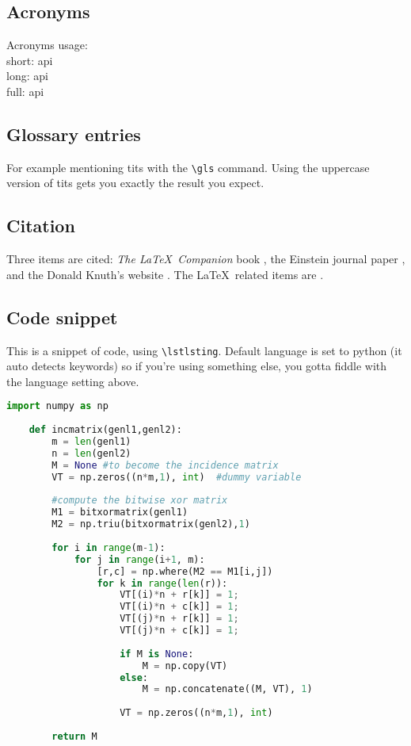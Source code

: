 \documentclass[12pt]{article}
\begin{document}
	\subsection{Acronyms}
	
	Acronyms usage: 
	\\ short: \acrshort{api} 
	\\ long: \acrlong{api}
	\\ full: \acrfull{api}
	
	
	\subsection{Glossary entries}
	
	For example mentioning \gls{tits} with the \texttt{\textbackslash gls} command. Using the uppercase version of \Gls{tits} gets you exactly the result you expect.

	\subsection{Citation}

	Three items are cited: \textit{The \LaTeX\ Companion} book \cite{latexcompanion}, the Einstein journal paper \cite{einstein}, and the Donald Knuth's website \cite{knuthwebsite}. The \LaTeX\ related items are \cite{latexcompanion,knuthwebsite}.
	\subsection{Code snippet}
	
    This is a snippet of code, using \texttt{\textbackslash lstlsting}. Default language is set to python (it auto detects keywords) so if you're using something else, you gotta fiddle with the language setting above.
    
    \begin{lstlisting}[language=Python]
    import numpy as np
     
    def incmatrix(genl1,genl2):
        m = len(genl1)
        n = len(genl2)
        M = None #to become the incidence matrix
        VT = np.zeros((n*m,1), int)  #dummy variable
     
        #compute the bitwise xor matrix
        M1 = bitxormatrix(genl1)
        M2 = np.triu(bitxormatrix(genl2),1) 
     
        for i in range(m-1):
            for j in range(i+1, m):
                [r,c] = np.where(M2 == M1[i,j])
                for k in range(len(r)):
                    VT[(i)*n + r[k]] = 1;
                    VT[(i)*n + c[k]] = 1;
                    VT[(j)*n + r[k]] = 1;
                    VT[(j)*n + c[k]] = 1;
     
                    if M is None:
                        M = np.copy(VT)
                    else:
                        M = np.concatenate((M, VT), 1)
     
                    VT = np.zeros((n*m,1), int)
     
        return M
    \end{lstlisting}
\end{document}
